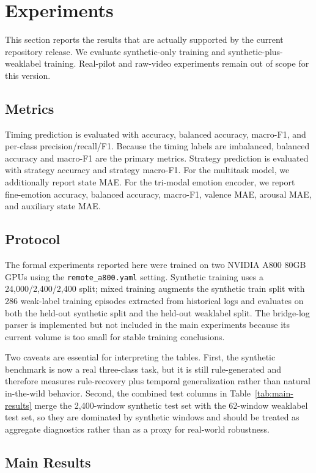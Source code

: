 \section{Experiments}
This section reports the results that are actually supported by the current repository release. We evaluate synthetic-only training and synthetic-plus-weaklabel training. Real-pilot and raw-video experiments remain out of scope for this version.

\subsection{Metrics}
Timing prediction is evaluated with accuracy, balanced accuracy, macro-F1, and per-class precision/recall/F1. Because the timing labels are imbalanced, balanced accuracy and macro-F1 are the primary metrics. Strategy prediction is evaluated with strategy accuracy and strategy macro-F1. For the multitask model, we additionally report state MAE. For the tri-modal emotion encoder, we report fine-emotion accuracy, balanced accuracy, macro-F1, valence MAE, arousal MAE, and auxiliary state MAE.

\subsection{Protocol}
The formal experiments reported here were trained on two NVIDIA A800 80GB GPUs using the \texttt{remote\_a800.yaml} setting. Synthetic training uses a 24{,}000/2{,}400/2{,}400 split; mixed training augments the synthetic train split with 286 weak-label training episodes extracted from historical logs and evaluates on both the held-out synthetic split and the held-out weaklabel split. The bridge-log parser is implemented but not included in the main experiments because its current volume is too small for stable training conclusions.

Two caveats are essential for interpreting the tables. First, the synthetic benchmark is now a real three-class task, but it is still rule-generated and therefore measures rule-recovery plus temporal generalization rather than natural in-the-wild behavior. Second, the combined test columns in Table~\ref{tab:main-results} merge the 2{,}400-window synthetic test set with the 62-window weaklabel test set, so they are dominated by synthetic windows and should be treated as aggregate diagnostics rather than as a proxy for real-world robustness.

\subsection{Main Results}


